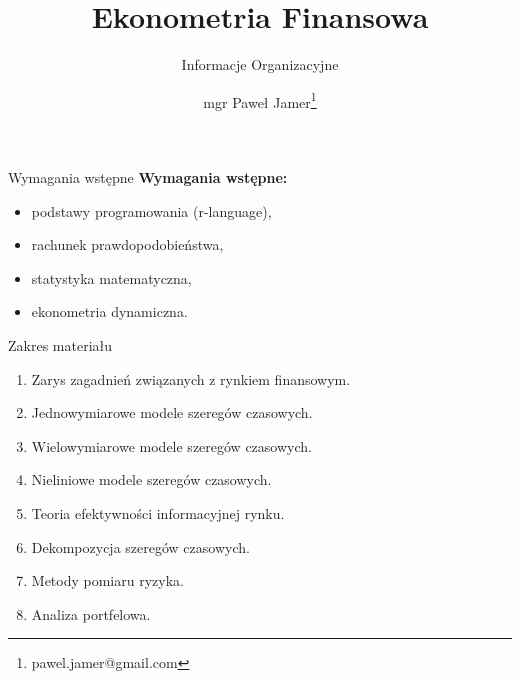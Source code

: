 \documentclass[a4paper, 11pt]{beamer}
\title{Ekonometria Finansowa}
\subtitle{Informacje Organizacyjne}
\author{mgr Paweł Jamer\thanks{pawel.jamer@gmail.com}}
\begin{document}
	\begin{frame}
		\titlepage
	\end{frame}

	\begin{frame}{Wymagania wstępne}
		\textbf{Wymagania wstępne:}
		\begin{itemize}
			\item podstawy programowania (r-language),
			\item rachunek prawdopodobieństwa,
			\item statystyka matematyczna,
			\item ekonometria dynamiczna.
		\end{itemize}
	\end{frame}
	
	\begin{frame}{Zakres materiału}
		\begin{enumerate}
			\item Zarys zagadnień związanych z rynkiem finansowym.
			\item Jednowymiarowe modele szeregów czasowych.
			\item Wielowymiarowe modele szeregów czasowych.
			\item Nieliniowe modele szeregów czasowych.
			\item Teoria efektywności informacyjnej rynku.
			\item Dekompozycja szeregów czasowych.
			\item Metody pomiaru ryzyka.
			\item Analiza portfelowa.
		\end{enumerate}
	\end{frame}
	
\end{document}
